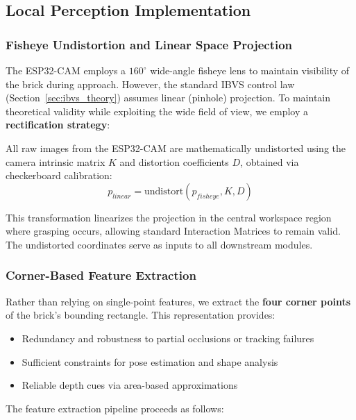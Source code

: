 \subsection{Local Perception Implementation}

\subsubsection{Fisheye Undistortion and Linear Space Projection}
The ESP32-CAM employs a $160^\circ$ wide-angle fisheye lens to maintain visibility of the brick during approach. However, the standard IBVS control law (Section~\ref{sec:ibvs_theory}) assumes linear (pinhole) projection. To maintain theoretical validity while exploiting the wide field of view, we employ a \textbf{rectification strategy}:

All raw images from the ESP32-CAM are mathematically undistorted using the camera intrinsic matrix $K$ and distortion coefficients $D$, obtained via checkerboard calibration:
\begin{equation}
    p_{linear} = \text{undistort}(p_{fisheye}, K, D)
\end{equation}

This transformation linearizes the projection in the central workspace region where grasping occurs, allowing standard Interaction Matrices to remain valid. The undistorted coordinates serve as inputs to all downstream modules.

\subsubsection{Corner-Based Feature Extraction}
Rather than relying on single-point features, we extract the \textbf{four corner points} of the brick's bounding rectangle. This representation provides:
\begin{itemize}
    \item Redundancy and robustness to partial occlusions or tracking failures
    \item Sufficient constraints for pose estimation and shape analysis
    \item Reliable depth cues via area-based approximations
\end{itemize}

The feature extraction pipeline proceeds as follows:


